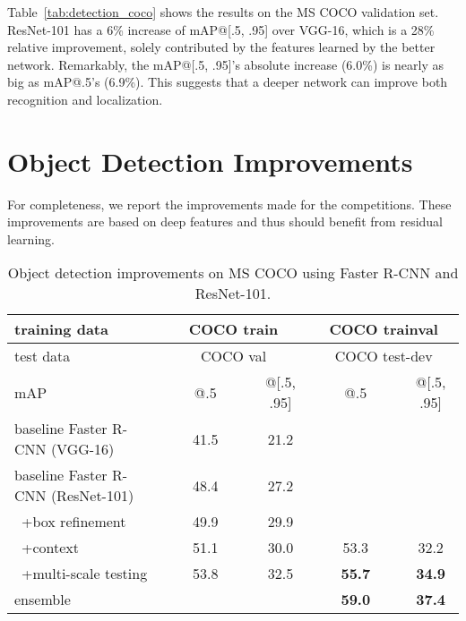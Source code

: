 Table~\ref{tab:detection_coco} shows the results on the MS COCO validation set. ResNet-101 has a 6\% increase of mAP@[.5, .95] over VGG-16, which is a 28\% relative improvement, solely contributed by the features learned by the better network. Remarkably, the mAP@[.5, .95]'s absolute increase (6.0\%) is nearly as big as mAP@.5's (6.9\%). This suggests that a deeper network can improve both recognition and localization.



\section{Object Detection Improvements}

For completeness, we report the improvements made for the competitions. These improvements are based on deep features and thus should benefit from residual learning.

\renewcommand\arraystretch{1.05}
\setlength{\tabcolsep}{4pt}
\begin{table*}[t]
\begin{center}
\small
\begin{tabular}{l|c|c|c|c}
\hline
training data & \multicolumn{2}{c|}{COCO train} & \multicolumn{2}{c}{COCO trainval} \\
\hline
test data & \multicolumn{2}{c|}{COCO val} & \multicolumn{2}{c}{COCO test-dev}\\
\hline
mAP & ~~~~@.5~~~~ & @[.5, .95] & ~~~~@.5~~~~ & @[.5, .95]\\
\hline
baseline Faster R-CNN (VGG-16)    & 41.5 & 21.2 & \\
baseline Faster R-CNN (ResNet-101)    & 48.4 & 27.2 & \\
~+box refinement &  49.9 & 29.9 & \\
~+context &  51.1 & 30.0 & 53.3 & 32.2 \\
~+multi-scale testing & 53.8 & 32.5 & \textbf{55.7} & \textbf{34.9} \\
\hline
ensemble & & & \textbf{59.0} & \textbf{37.4} \\
\hline
\end{tabular}
\end{center}
\vspace{-.5em}
\caption{Object detection improvements on MS COCO using Faster R-CNN and ResNet-101.}
\vspace{-.5em}
\label{tab:detection_coco_improve}
\end{table*}

